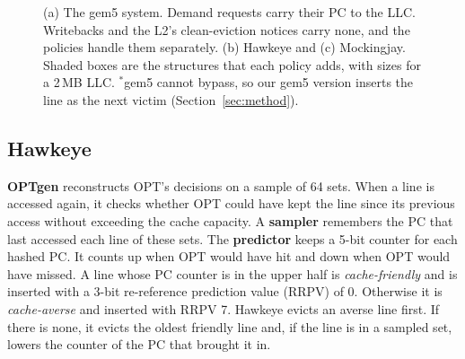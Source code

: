 \documentclass[10pt,journal,compsoc]{IEEEtran}
\begin{document}
\begin{figure}[t]
{}
\caption{(a) The gem5 system. Demand requests carry their PC to the LLC.
Writebacks and the L2's clean-eviction notices carry none, and the policies
handle them separately. (b) Hawkeye and (c) Mockingjay. Shaded boxes are the
structures that each policy adds, with sizes for a 2\,MB LLC. $^{\ast}$gem5
cannot bypass, so our gem5 version inserts the line as the next victim
(Section~\ref{sec:method}).}
\label{fig:arch}
\end{figure}

\subsection{Hawkeye}

\textbf{OPTgen} reconstructs OPT's decisions on a sample of 64 sets. When a
line is accessed again, it checks whether OPT could have kept the line since its
previous access without exceeding the cache capacity. A \textbf{sampler}
remembers the PC that last accessed each line of these sets. The
\textbf{predictor} keeps a 5-bit counter for each hashed PC. It counts up when
OPT would have hit and down when OPT would have missed. A line whose PC counter
is in the upper half is \emph{cache-friendly} and is inserted with a 3-bit
re-reference prediction value (RRPV) of 0. Otherwise it is
\emph{cache-averse} and inserted with RRPV 7. Hawkeye evicts an averse line
first. If there is none, it evicts the oldest friendly line and, if the line is
in a sampled set, lowers the counter of the PC that brought it in.
\end{document}
